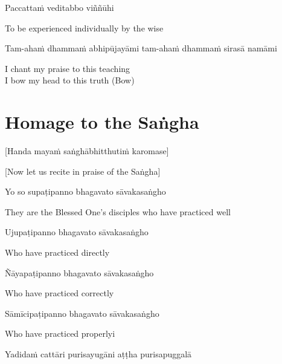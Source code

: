 Paccattaṁ veditabbo viññūhi

\begin{english}
  To be experienced individually by the wise
\end{english}

Tam-ahaṁ dhammaṁ abhipūjayāmi tam-ahaṁ dhammaṁ sirasā namāmi

\begin{english}
  I chant my praise to this teaching\\
  I bow my head to this truth \hfill{(Bow)}
\end{english}

\section{Homage to the Saṅgha}
\label{homage-sangha}

\begin{center}
  [Handa mayaṁ saṅghābhitthutiṁ karomase]
\end{center}
\begin{center}
  [Now let us recite in praise of the Saṅgha]
\end{center}

Yo so supaṭipanno bhagavato sāvakasaṅgho

\begin{english}
  They are the Blessed One’s disciples who have practiced well
\end{english}

Ujupaṭipanno bhagavato sāvakasaṅgho

\begin{english}
  Who have practiced directly
\end{english}

Ñāyapaṭipanno bhagavato sāvakasaṅgho

\begin{english}
  Who have practiced correctly
\end{english}

Sāmīcipaṭipanno bhagavato sāvakasaṅgho

\begin{english}
  Who have practiced properlyi
\end{english}

Yadidaṁ cattāri purisayugāni aṭṭha purisapuggalā

